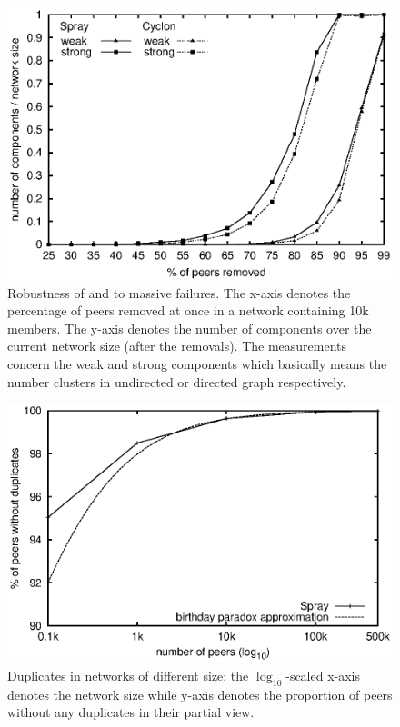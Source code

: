 \begin{figure}
  \centering
  \includegraphics[width=.8\textwidth]{img/spray/resilience.eps}
  \caption{\label{fig:resilience}Robustness of \CYCLON and \SPRAY to massive
    failures. The x-axis denotes the percentage of peers removed at once in a
    network containing 10k members. The y-axis denotes the number of
    components over the current network size (after the removals). The
    measurements concern the weak and strong components which basically means
    the number clusters in undirected or directed graph respectively.}
\end{figure}


\begin{figure}
  \centering
  \includegraphics[width=.8\textwidth]{img/spray/duplicates.eps}
  \caption{\label{fig:duplicates}Duplicates in networks of different size: the
    $\log_{10}$-scaled x-axis denotes the network size while y-axis denotes the
    proportion of peers without any duplicates in their partial view.}
\end{figure}

